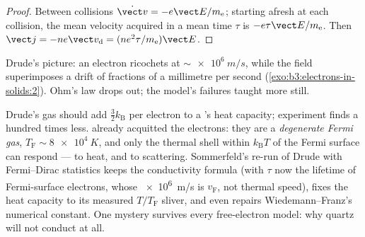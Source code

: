 \begin{proof}
Between collisions $\dot{\vect v} = -e\vect E/m_{\text{e}}$;
starting afresh at each collision, the mean velocity acquired in a
mean time $\tau$ is $-e\tau\vect E/m_{\text{e}}$. Then $\vect j =
-ne\vect v_{\text{d}} = (ne^2\tau/m_{\text{e}})\vect E$.
\end{proof}

\begin{omfigure}

{\small Drude's picture: an electron ricochets at
$\sim\qty{e6}{m/s}$, while the field superimposes a drift of
fractions of a millimetre per second
(\cref{exo:b3:electrons-in-solids:2}). Ohm's law drops out; the
model's failures taught more still.}
\end{omfigure}

\begin{remark}\label{rem:b3:electrons-in-solids:sommerfeld}
Drude's gas should add $\tfrac32k_{\text{B}}$ per electron to a
's heat capacity; experiment finds a hundred times less.
 already acquitted the electrons:
they are a \emph{degenerate Fermi gas}, $T_{\text{F}} \sim
\qty{8e4}{K}$, and only the thermal shell within
$k_{\text{B}}T$ of the Fermi surface can respond --- to heat, and
to scattering. Sommerfeld's re-run of Drude with Fermi--Dirac
statistics keeps the conductivity formula (with $\tau$ now the
lifetime of Fermi-surface electrons, whose \qty{e6}{m/s} is
$v_{\text{F}}$, not thermal speed), fixes the heat capacity to its
measured $T/T_{\text{F}}$ sliver, and even repairs
Wiedemann--Franz's numerical constant. One mystery survives every
free-electron model: why quartz will not conduct at all.
\end{remark}

